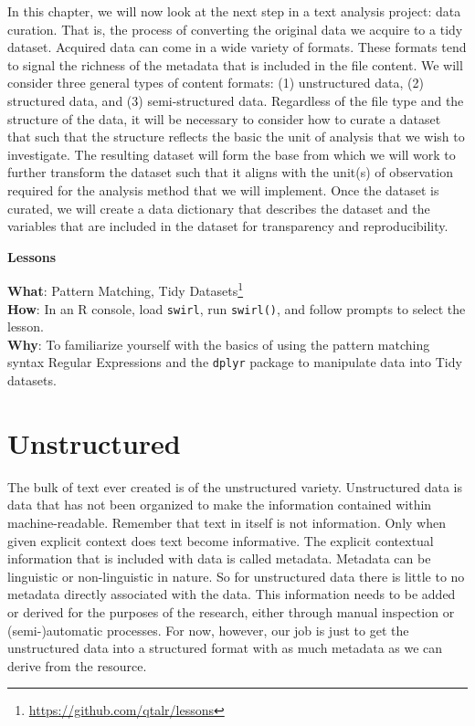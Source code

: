 \documentclass[
  letterpaper,
]{latex/krantz}
\theoremstyle{definition}
\theoremstyle{remark}
\DeclareRobustCommand{\href}[2]{#2\footnote{\url{#1}}}
\begin{document}
In this chapter, we will now look at the next step in a text analysis
project: data curation. That is, the process of converting the original
data we acquire to a tidy dataset. Acquired data can come in a wide
variety of formats. These formats tend to signal the richness of the
metadata that is included in the file content. We will consider three
general types of content formats: (1) unstructured data, (2) structured
data, and (3) semi-structured data. Regardless of the file type and the
structure of the data, it will be necessary to consider how to curate a
dataset that such that the structure reflects the basic the unit of
analysis that we wish to investigate. The resulting dataset will form
the base from which we will work to further transform the dataset such
that it aligns with the unit(s) of observation required for the analysis
method that we will implement. Once the dataset is curated, we will
create a data dictionary that describes the dataset and the variables
that are included in the dataset for transparency and reproducibility.

\begin{tcolorbox}[enhanced jigsaw, toprule=.15mm, breakable, colback=white, opacityback=0, leftrule=.75mm, bottomrule=.15mm, colframe=quarto-callout-color-frame, left=2mm, arc=.35mm, rightrule=.15mm]

\textbf{ Lessons}

\textbf{What}: \href{https://github.com/qtalr/lessons}{Pattern Matching,
Tidy Datasets}\\
\textbf{How}: In an R console, load \texttt{swirl}, run
\texttt{swirl()}, and follow prompts to select the lesson.\\
\textbf{Why}: To familiarize yourself with the basics of using the
pattern matching syntax Regular Expressions and the \texttt{dplyr}
package to manipulate data into Tidy datasets.

\end{tcolorbox}

\section{Unstructured}\label{unstructured}

The bulk of text ever created is of the unstructured variety.
Unstructured data is data that has not been organized to make the
information contained within machine-readable. Remember that text in
itself is not information. Only when given explicit context does text
become informative. The explicit contextual information that is included
with data is called metadata. Metadata can be linguistic or
non-linguistic in nature. So for unstructured data there is little to no
metadata directly associated with the data. This information needs to be
added or derived for the purposes of the research, either through manual
inspection or (semi-)automatic processes. For now, however, our job is
just to get the unstructured data into a structured format with as much
metadata as we can derive from the resource.
\end{document}
